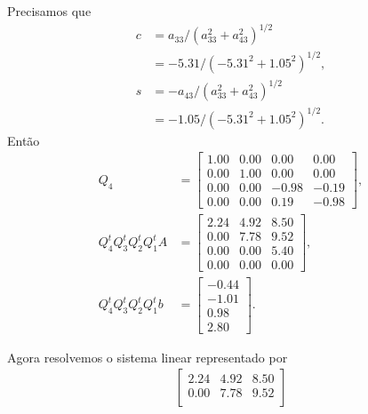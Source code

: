 \begin{questions}
\begin{solution}
\begin{enumerate}
                Precisamos que
                \begin{align*}
                    c &= a_{33} / \left( a_{33}^2 + a_{43}^2 \right)^{1 / 2} \\
                    &= -5.31 / \left( -5.31^2 + 1.05^2 \right)^{1 / 2}, \\
                    s &= - a_{43} / \left( a_{33}^2 + a_{43}^2 \right)^{1 / 2} \\
                    &= -1.05 / \left( -5.31^2 + 1.05^2 \right)^{1 / 2}.
                \end{align*}
                Ent\~{a}o
                \begin{align*}
                    Q_4 &= \begin{bmatrix}
                        1.00 & 0.00 & 0.00 & 0.00 \\
                        0.00 & 1.00 & 0.00 & 0.00 \\
                        0.00 & 0.00 & -0.98 & -0.19 \\
                        0.00 & 0.00 & 0.19 & -0.98
                    \end{bmatrix}, \\
                    Q_4^t Q_3^t Q_2^t Q_1^t A &= \begin{bmatrix}
                        2.24 & 4.92 & 8.50 \\
                        0.00 & 7.78 & 9.52 \\
                        0.00 & 0.00 & 5.40 \\
                        0.00 & 0.00 & 0.00
                    \end{bmatrix}, \\
                    Q_4^t Q_3^t Q_2^t Q_1^t b &= \begin{bmatrix}
                        -0.44 \\
                        -1.01 \\
                        0.98 \\
                        2.80
                    \end{bmatrix}.
                \end{align*}
        \end{enumerate}
        Agora resolvemos o sistema linear representado por
        \begin{align*}
            \begin{bmatrix}
                2.24 & 4.92 & 8.50 \\
                0.00 & 7.78 & 9.52 \\

\end{bmatrix}
\end{align*}
\end{solution}
\end{questions}
